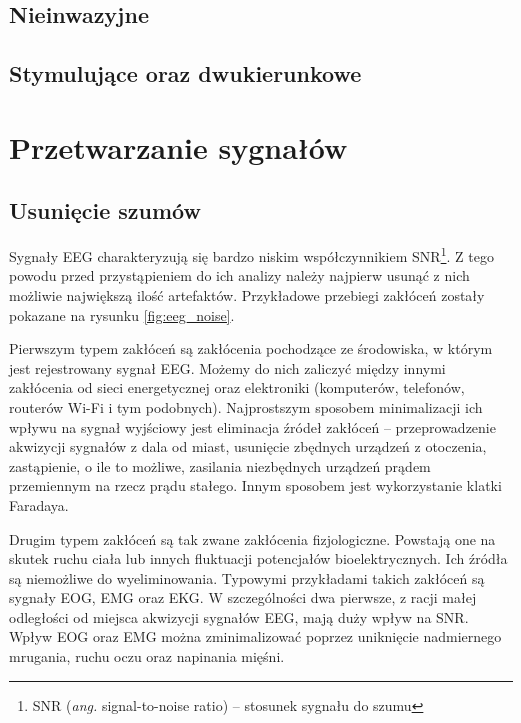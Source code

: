 \documentclass[skorowidz,skroty]{dyplomWEZUT}
\begin{document}
\subsection{Nieinwazyjne}
\subsection{Stymulujące oraz dwukierunkowe}

\section{Przetwarzanie sygnałów}
\subsection{Usunięcie szumów}
Sygnały EEG charakteryzują się bardzo niskim współczynnikiem SNR\footnote{SNR (\textit{ang.} signal-to-noise ratio) -- stosunek sygnału do szumu}\cite{bci_trends}. Z tego powodu przed przystąpieniem do ich analizy należy najpierw usunąć z nich możliwie największą ilość artefaktów. Przykładowe przebiegi zakłóceń zostały pokazane na rysunku \vref{fig:eeg_noise}.

Pierwszym typem zakłóceń są zakłócenia pochodzące ze środowiska, w którym jest rejestrowany sygnał EEG. Możemy do nich zaliczyć między innymi zakłócenia od sieci energetycznej oraz elektroniki (komputerów, telefonów, routerów Wi-Fi i tym podobnych). Najprostszym sposobem minimalizacji ich wpływu na sygnał wyjściowy jest eliminacja źródeł zakłóceń -- przeprowadzenie akwizycji sygnałów z dala od miast, usunięcie zbędnych urządzeń z otoczenia, zastąpienie, o ile to możliwe, zasilania niezbędnych urządzeń prądem przemiennym na rzecz prądu stałego. Innym sposobem jest wykorzystanie klatki Faradaya.

Drugim typem zakłóceń są tak zwane zakłócenia fizjologiczne. Powstają one na skutek ruchu ciała lub innych fluktuacji potencjałów bioelektrycznych. Ich źródła są niemożliwe do wyeliminowania. Typowymi przykładami takich zakłóceń są sygnały EOG, EMG oraz EKG. W szczególności dwa pierwsze, z racji małej odległości od miejsca akwizycji sygnałów EEG, mają duży wpływ na SNR. Wpływ EOG oraz EMG można zminimalizować poprzez uniknięcie nadmiernego mrugania, ruchu oczu oraz napinania mięśni.
\end{document}
